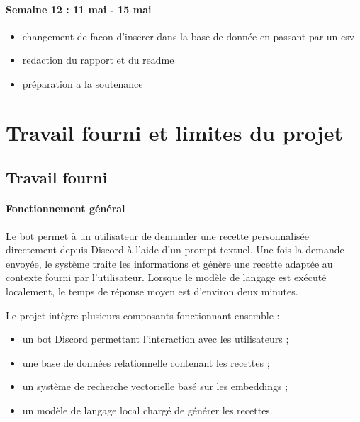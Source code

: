 \documentclass[12pt]{article}
\begin{document}
            \paragraph{Semaine 12 : 11 mai - 15 mai}
                    \begin{itemize}
                    \item changement de facon d'inserer dans la base de donnée en passant par un csv 
                    \item redaction du rapport et du readme 
                    \item préparation a la soutenance 
                \end{itemize}

    \section{Travail fourni et limites du projet}

    \subsection{Travail fourni}

        \paragraph{Fonctionnement général}
            Le bot permet à un utilisateur de demander une recette personnalisée directement depuis Discord à l’aide d’un prompt textuel.
            Une fois la demande envoyée, le système traite les informations et génère une recette adaptée au contexte fourni par l’utilisateur.
            Lorsque le modèle de langage est exécuté localement, le temps de réponse moyen est d’environ deux minutes.

            Le projet intègre plusieurs composants fonctionnant ensemble :
            \begin{itemize}
                \item un bot Discord permettant l’interaction avec les utilisateurs ;
                \item une base de données relationnelle contenant les recettes ;
                \item un système de recherche vectorielle basé sur les embeddings ;
                \item un modèle de langage local chargé de générer les recettes.
            \end{itemize}
\end{document}
